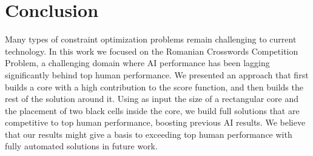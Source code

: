 \section{Conclusion}

Many types of constraint optimization problems remain challenging to current
technology.
In this work we focused on
the Romanian Crosswords Competition Problem,
a challenging domain where AI performance has been lagging significantly behind top human performance.
We presented an approach that first builds a core with a high contribution to the score function,
and then builds the rest of the solution around it.
Using as input the size of a rectangular core and the placement of two black cells inside the core,
we build full solutions that are competitive to top human performance,
boosting previous AI results.
We believe that our results might give a basis to exceeding top human performance with fully automated solutions in future work.

